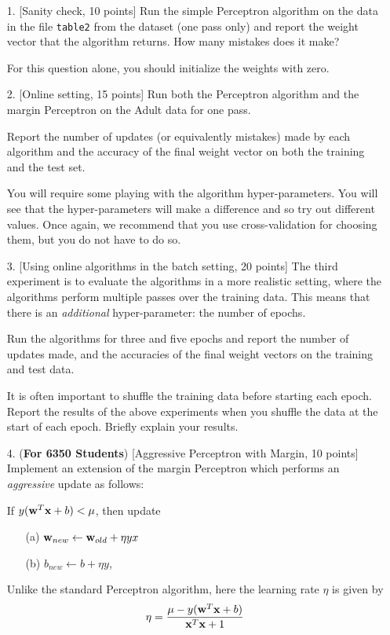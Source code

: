 \begin{enumerate}
\item[1.] [Sanity check, 10 points] Run the simple Perceptron
  algorithm on the data in the file {\tt table2} from the dataset (one
  pass only) and report the weight vector that the algorithm returns.
  How many mistakes does it make?

  For this question alone, you should initialize the weights with
  zero.
  
\item[2.] [Online setting, 15 points] Run both the Perceptron algorithm
  and the margin Perceptron on the Adult data for one pass. 
  
  Report the number of updates (or equivalently mistakes) made by each
  algorithm and the accuracy of the final weight vector on both the
  training and the test set.

  You will require some playing with the algorithm hyper-parameters.
  You will see that the hyper-parameters will make a difference and so
  try out different values. Once again, we recommend that you use
  cross-validation for choosing them, but you do not have to do so.

\item[3.] [Using online algorithms in the batch setting, 20 points]
  The third experiment is to evaluate the algorithms in a more
  realistic setting, where the algorithms perform multiple passes over
  the training data. This means that there is an {\em additional}
  hyper-parameter: the number of epochs.

  Run the algorithms for three and five epochs and report the number
  of updates made, and the accuracies of the final weight vectors on
  the training and test data.
  
  It is often important to shuffle the training data before starting
  each epoch. Report the results of the above experiments when you
  shuffle the data at the start of each epoch. Briefly explain your
  results.

\item[4.] ({\bf For 6350 Students}) [Aggressive Perceptron with
  Margin, 10 points] Implement an extension of the margin Perceptron
  which performs an {\em aggressive} update as follows:

  If $y ({\bf w}^T{\bf x} + b) < \mu$, then update
  \begin{itemize}
  \item[(a)] ${\bf w}_{new} \leftarrow {\bf w}_{old} + \eta yx$
  \item[(b)] $b_{new} \leftarrow b + \eta y$,
  \end{itemize}
  Unlike the standard Perceptron algorithm, here the learning rate
  $\eta$ is given by
  $$\eta = \frac{\mu - y({\bf w}^T{\bf x} + b)}{{\bf x}^T{\bf x} + 1}$$
  

\end{enumerate}
